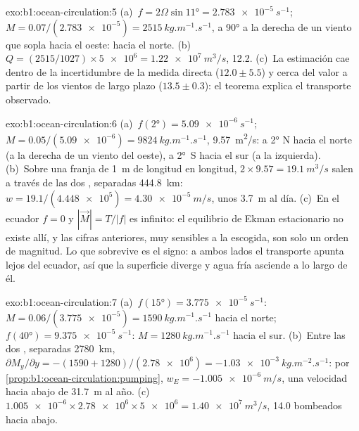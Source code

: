 \begin{solution}{exo:b1:ocean-circulation:5}
(a)~$f = 2\Omega\sin\ang{11} = \qty{2.783e-5}{s^{-1}}$; $M = 0.07/(\num{2.783e-5}) =
\qty{2515}{kg.m^{-1}.s^{-1}}$, a \ang{90} a la derecha de un viento que sopla hacia el oeste: hacia el norte. (b)~$Q = (2515/1027) \times \num{5e6} = \qty{1.22e7}{m^3/s}$,
\qty{12.2}{\sverdrup}. (c)~La estimación cae dentro de la incertidumbre de la medida directa ($12.0 \pm 5.5$) y cerca del valor a partir de los vientos de largo plazo ($13.5 \pm 0.3$): el teorema explica el transporte observado.
\end{solution}

\begin{solution}{exo:b1:ocean-circulation:6}
(a)~$f(\ang{2}) = \qty{5.09e-6}{s^{-1}}$; $M = 0.05/(\num{5.09e-6}) =
\qty{9824}{kg.m^{-1}.s^{-1}}$, \qty{9.57}{m^2/s}: a \ang{2} N hacia el norte (a la derecha de un viento del oeste), a \ang{2}~S hacia el sur (a la izquierda). (b)~Sobre una franja de \qty{1}{m} de longitud en longitud, $2 \times 9.57 = \qty{19.1}{m^3/s}$ salen a través de las dos , separadas \qty{444.8}{km}: $w = 19.1/(\num{4.448e5}) = \qty{4.30e-5}{m/s}$,
unos \qty{3.7}{m} al día. (c)~En el ecuador $f = 0$ y $|\vec M| = T/|f|$ es infinito: el equilibrio de Ekman estacionario no existe allí, y las cifras anteriores, muy sensibles a la  escogida, son solo un orden de magnitud. Lo que sobrevive es el signo: a ambos lados el transporte apunta lejos del ecuador, así que la superficie diverge y agua fría asciende a lo largo de él.
\end{solution}

\begin{solution}{exo:b1:ocean-circulation:7}
(a)~$f(\ang{15}) = \qty{3.775e-5}{s^{-1}}$: $M = 0.06/(\num{3.775e-5}) =
\qty{1590}{kg.m^{-1}.s^{-1}}$ hacia el norte; $f(\ang{40}) =
\qty{9.375e-5}{s^{-1}}$: $M = \qty{1280}{kg.m^{-1}.s^{-1}}$ hacia el sur.
(b)~Entre las dos , separadas \qty{2780}{km}, $\partial M_y/\partial y =
-(1590 + 1280)/(\num{2.78e6}) = \qty{-1.03e-3}{kg.m^{-2}.s^{-1}}$: por \cref{prop:b1:ocean-circulation:pumping}, $w_E = \qty{-1.005e-6}{m/s}$, una velocidad hacia abajo de \qty{31.7}{m} al año. (c)~$\num{1.005e-6} \times \num{2.78e6} \times
\num{5e6} = \qty{1.40e7}{m^3/s}$, \qty{14.0}{\sverdrup} bombeados hacia abajo.
\end{solution}


